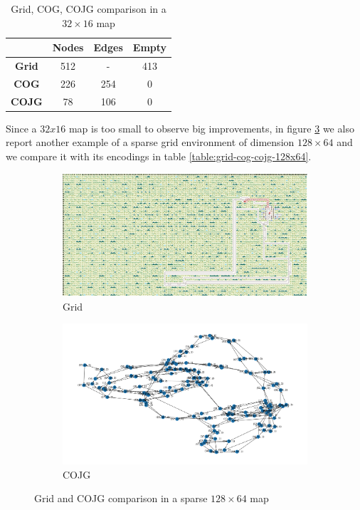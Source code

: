 \documentclass[a4paper,10pt]{report}
\begin{document}
\begin{table}[h]
	\center
	\begin{tabular}{||c c c c||}
		\hline
		              & \textbf{Nodes} & \textbf{Edges} & \textbf{Empty} \\ [0.5ex]
		\hline\hline
		\textbf{Grid} & 512            & -              & \num{413}      \\
		\hline
		\textbf{COG}  & 226            & 254            & 0              \\
		\hline
		\textbf{COJG} & 78             & 106            & 0              \\
		\hline
	\end{tabular}
	\caption{Grid, COG, COJG comparison in a $32\times 16$ map}
	\label{table:grid-cog-cojg-32x16}
\end{table}

Since a $32x16$ map is too small to observe big improvements, in figure \ref{fig:grid-cog-cojg-128x64} we also report another example of a sparse grid environment of dimension $128\times64$ and we compare it with its encodings in table \ref{table:grid-cog-cojg-128x64}.

\begin{figure}[!h]
	\begin{subfigure}[b]{\linewidth}
		\includegraphics[width=\textwidth]{grid-env-128x64.png}
		\caption{Grid}
		\label{fig:grid-env-128x64}
	\end{subfigure}%

	\begin{subfigure}[b]{\linewidth}
		\includegraphics[width=\textwidth]{cojg-env-128x64.png}
		\caption{COJG}
		\label{fig:cojg-env-128x64}
	\end{subfigure}%

	\caption{Grid and COJG comparison in a sparse $128\times64$ map}
	\label{fig:grid-cog-cojg-128x64}
\end{figure}
\end{document}
